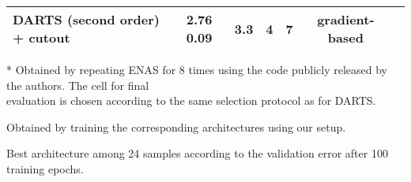 \documentclass{article}
\begin{document}
\begin{table}[ht]
\begin{threeparttable}[b]
{\begin{tabular}{@{}lcccccc@{}}
DARTS (second order) + cutout                             & 2.76  0.09 &  3.3  & 4 & 7 & gradient-based \\ \bottomrule
\end{tabular}
}
\begin{tablenotes}
\item[*] {\footnotesize Obtained by repeating ENAS for 8 times using the code publicly released by the authors. The cell for final \\ evaluation is chosen according to the same selection protocol as for DARTS.
}
\item[] {\footnotesize Obtained by training the corresponding architectures using our setup.}
\item[\ddag] {\footnotesize Best architecture among 24 samples according to the validation error after 100 training epochs.
}
\end{tablenotes}
\end{threeparttable}
\end{table}
\end{document}
